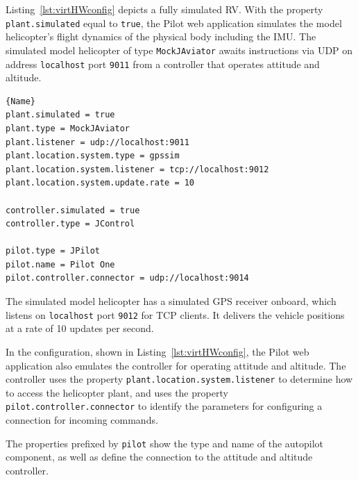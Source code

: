 Listing~\ref{lst:virtHWconfig} depicts a fully simulated \ac{RV}. With the property \texttt{plant.simulated} equal
to \texttt{true}, the Pilot web application simulates the model helicopter's flight dynamics of the physical body
including the \ac{IMU}.
The simulated model helicopter of type \texttt{MockJAviator} 
awaits instructions via \acs{UDP} on address \texttt{localhost} port \texttt{9011} from a controller that
operates attitude and altitude. 
\lstset{tabsize=3,language=Tex}
\begin{lstlisting}[caption={Virtual Hardware Configuration Example},mathescape=true,label=lst:virtHWconfig]{Name}
plant.simulated = true
plant.type = MockJAviator
plant.listener = udp://localhost:9011
plant.location.system.type = gpssim
plant.location.system.listener = tcp://localhost:9012
plant.location.system.update.rate = 10

controller.simulated = true
controller.type = JControl

pilot.type = JPilot
pilot.name = Pilot One
pilot.controller.connector = udp://localhost:9014
\end{lstlisting}
The simulated model helicopter has a simulated GPS receiver onboard, which listens on \texttt{localhost} port
\texttt{9012} for \acs{TCP} clients. It delivers the vehicle positions at a rate of 10 updates per second.  

In the configuration, shown in Listing~\ref{lst:virtHWconfig}, the
Pilot web application also emulates the controller for operating attitude and altitude. The controller uses
the property \texttt{plant.location.system.listener} to determine how to access the helicopter plant, and
uses the property \texttt{pilot.controller.connector} to identify the parameters for configuring a connection
for incoming commands.

The properties prefixed by \texttt{pilot} show the type and name of the autopilot component, as well as
define the connection to the attitude and altitude controller.

